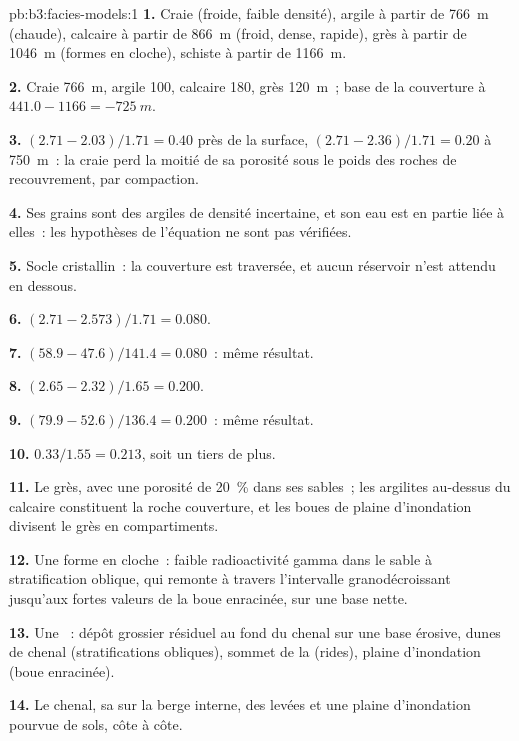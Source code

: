 \begin{solution}{pb:b3:facies-models:1}
\textbf{1.} Craie (froide, faible densité), argile à partir de \qty{766}{m} (chaude), calcaire à partir de
\qty{866}{m} (froid, dense, rapide), grès à partir de \qty{1046}{m} (formes en
cloche), schiste à partir de \qty{1166}{m}.

\textbf{2.} Craie \qty{766}{m}, argile 100, calcaire 180, grès
\qty{120}{m}~; base de la couverture à $441.0 - 1166 = \qty{-725}{m}$.

\textbf{3.} $(2.71 - 2.03)/1.71 = 0.40$ près de la surface, $(2.71 -
2.36)/1.71 = 0.20$ à \qty{750}{m}~: la craie perd la moitié de sa porosité
sous le poids des roches de recouvrement, par compaction.

\textbf{4.} Ses grains sont des argiles de densité incertaine, et son eau est
en partie liée à elles~: les hypothèses de l'équation ne sont pas vérifiées.

\textbf{5.} Socle cristallin~: la couverture est traversée, et aucun réservoir n'est
attendu en dessous.

\textbf{6.} $(2.71 - 2.573)/1.71 = 0.080$.

\textbf{7.} $(58.9 - 47.6)/141.4 = 0.080$~: même résultat.

\textbf{8.} $(2.65 - 2.32)/1.65 = 0.200$.

\textbf{9.} $(79.9 - 52.6)/136.4 = 0.200$~: même résultat.

\textbf{10.} $0.33/1.55 = 0.213$, soit un tiers de plus.

\textbf{11.} Le grès, avec une porosité de \qty{20}{\percent} dans ses sables~;
les argilites au-dessus du calcaire constituent la roche couverture, et les boues de plaine d'inondation divisent le
grès en compartiments.

\textbf{12.} Une forme en cloche~: faible radioactivité gamma dans le sable à stratification oblique, qui remonte à travers
l'intervalle granodécroissant jusqu'aux fortes valeurs de la boue enracinée, sur une base nette.

\textbf{13.} Une ~: dépôt grossier résiduel au fond du chenal sur une base
érosive, dunes de chenal (stratifications obliques), sommet de la  (rides), plaine
d'inondation (boue enracinée).

\textbf{14.} Le chenal, sa  sur la berge interne, des levées et une
plaine d'inondation pourvue de sols, côte à côte.


\end{solution}
